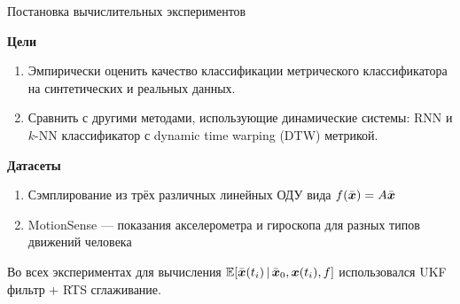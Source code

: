 \documentclass[10pt]{beamer}
\newcommand{\bx}{\ensuremath{\boldsymbol{x}}}
\newcommand{\bbx}{\ensuremath\bar{{\boldsymbol{x}}}}
\begin{document}
	\begin{frame}{Постановка вычислительных экспериментов}
	
	\textbf{Цели}
	
	\begin{enumerate}
		\item Эмпирически оценить качество классификации метрического классификатора на синтетических и реальных данных.
		\item Сравнить с другими методами, использующие динамические системы: RNN и $k$-NN классификатор с dynamic time warping (DTW) метрикой.
	\end{enumerate}
	
	\textbf{Датасеты}
	
	\begin{enumerate}
		\item Сэмплирование из трёх различных линейных ОДУ вида $f(\bbx) = A \bbx$
		\item MotionSense --- показания акселерометра и гироскопа для разных типов движений человека
	\end{enumerate}
	
	Во всех экспериментах для вычисления $\mathbb{E}[\bbx(t_i) \,|\, \bbx_0, \bx(t_i), f]$ использовался UKF фильтр + RTS сглаживание.
	\end{frame}
\end{document}
